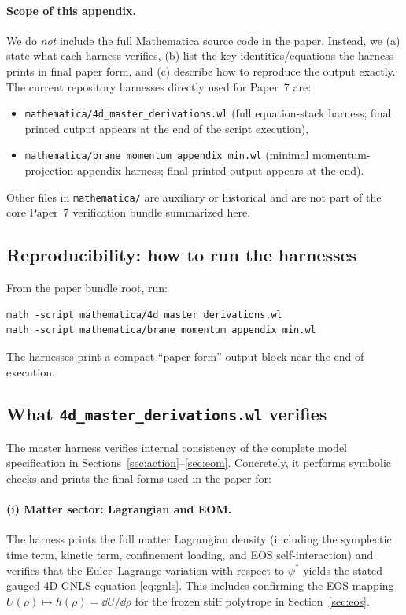 \documentclass[11pt]{article}
\begin{document}
\paragraph{Scope of this appendix.}
We do \emph{not} include the full Mathematica source code in the paper. Instead, we (a) state what each harness verifies, (b) list the key identities/equations the harness prints in final paper form, and (c) describe how to reproduce the output exactly. The current repository harnesses directly used for Paper~7 are:
\begin{itemize}[leftmargin=2.0em]
\item \texttt{mathematica/4d\_master\_derivations.wl} (full equation-stack harness; final printed output appears at the end of the script execution),
\item \texttt{mathematica/brane\_momentum\_appendix\_min.wl} (minimal momentum-projection appendix harness; final printed output appears at the end).
\end{itemize}
Other files in \texttt{mathematica/} are auxiliary or historical and are not part of the core Paper~7 verification bundle summarized here.

\subsection{Reproducibility: how to run the harnesses}
\label{app:wl-repro}

From the paper bundle root, run:
\begin{verbatim}
math -script mathematica/4d_master_derivations.wl
math -script mathematica/brane_momentum_appendix_min.wl
\end{verbatim}
The harnesses print a compact ``paper-form'' output block near the end of execution.

\subsection{What \texttt{4d\_master\_derivations.wl} verifies}
\label{app:wl-master}

The master harness verifies internal consistency of the complete model specification in Sections~\ref{sec:action}--\ref{sec:eom}. Concretely, it performs symbolic checks and prints the final forms used in the paper for:

\paragraph{(i) Matter sector: Lagrangian and EOM.}
The harness prints the full matter Lagrangian density (including the symplectic time term, kinetic term, confinement loading, and EOS self-interaction) and verifies that the Euler--Lagrange variation with respect to $\psi^*$ yields the stated gauged 4D GNLS equation \eqref{eq:gnls}. This includes confirming the EOS mapping $U(\rho)\mapsto h(\rho)=\dd U/\dd\rho$ for the frozen stiff polytrope in Section~\ref{sec:eos}.
\end{document}
